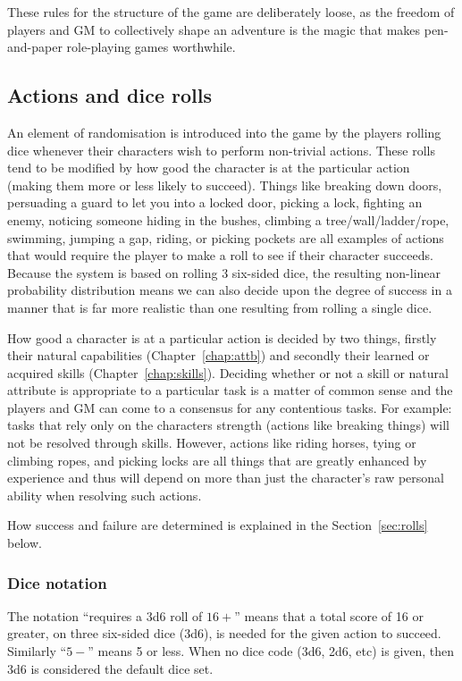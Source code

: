 \documentclass[a4paper,10pt,oneside]{book}
\begin{document}
These rules for the structure of the game are deliberately loose, as the freedom of players and GM to collectively shape an adventure is the magic that makes pen-and-paper role-playing games worthwhile.

\subsection{Actions and dice rolls}
An element of randomisation is introduced into the game by the players rolling dice whenever their characters wish to perform non-trivial actions. These rolls tend to be modified by how good the character is at the particular action (making them more or less likely to succeed). Things like breaking down doors, persuading a guard to let you into a locked door, picking a lock, fighting an enemy, noticing someone hiding in the bushes, climbing a tree/wall/ladder/rope, swimming, jumping a gap, riding, or picking pockets are all examples of actions that would require the player to make a roll to see if their character succeeds. Because the system is based on rolling 3 six-sided dice, the resulting non-linear probability distribution means we can also decide upon the degree of success in a manner that is far more realistic than one resulting from rolling a single dice. 

How good a character is at a particular action is decided by two things, firstly their natural capabilities (Chapter~\ref{chap:attb}) and secondly their learned or acquired skills (Chapter~\ref{chap:skills}). Deciding whether or not a skill or natural attribute is appropriate to a particular task is a matter of common sense and the players and GM can come to a consensus for any contentious tasks. For example: tasks that rely only on the characters strength (actions like breaking things) will not be resolved through skills. However, actions like riding horses, tying or climbing ropes, and picking locks are all things that are greatly enhanced by experience and thus will depend on more than just the character's raw personal ability when resolving such actions.  

How success and failure are determined is explained in the Section~\ref{sec:rolls} below.

\subsubsection{Dice notation}
The notation ``requires a 3d6 roll of $16+$'' means that a total score of 16 or greater, on three six-sided dice (3d6), is needed for the given action to succeed. Similarly ``$5-$'' means 5 or less. When no dice code (3d6, 2d6, etc) is given, then 3d6 is considered the default dice set.
\end{document}
